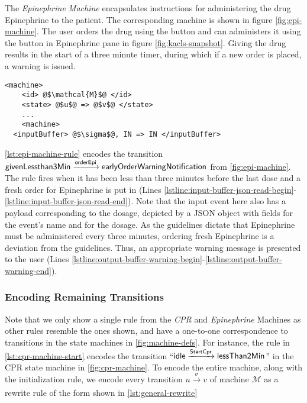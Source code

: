 The \textit{Epinephrine Machine} encapsulates instructions for administering
the drug Epinephrine to the patient. The corresponding machine is shown in figure
\ref{fig:epi-machine}. The user orders the drug using the
 button and can administers it using the  button in
Epinephrine pane in figure \ref{fig:kacls-snapshot}. Giving the drug results in the
start of a three minute timer, during which if a new order is placed, a warning
is issued.

\begin{lstlisting}[float=b!,
  frame=single,
  style=ksty,
  language=k,
  label={lst:general-rewrite},
  caption={Transitions as $\K$-Rules}
]
  <machine>
    <id> @$\mathcal{M}$@ </id>
    <state> @$u$@ => @$v$@ </state>
    ...
    <machine>
  <inputBuffer> @$\sigma$@, IN => IN </inputBuffer>
\end{lstlisting}

\autoref{lst:epi-machine-rule} encodes the transition
$\text{\sffamily givenLessthan3Min} \xrightarrow[]{\text{\sffamily orderEpi}}
\text{\sffamily earlyOrderWarningNotification}$ from \autoref{fig:epi-machine}.
The rule fires when it has been less than three minutes
before the last dose and a fresh order for
Epinephrine is put in (Lines
\ref{lstline:input-buffer-json-read-begin}-\ref{lstline:input-buffer-json-read-end}).
Note that the input event here also has a payload corresponding to the dosage,
depicted by a JSON object with fields  for the event's name
and  for the dosage.
As the guidelines dictate that Epinephrine must be administered
every three minutes, ordering fresh Epinephrine is a deviation from the
guidelines. Thus, an appropriate warning message is presented to the user (Lines
\ref{lstline:output-buffer-warning-begin}-\ref{lstline:output-buffer-warning-end}).

\subsubsection{Encoding Remaining Transitions}

Note that we only show a single rule from the \textit{CPR} and
\textit{Epinephrine} Machines as other rules resemble the ones
shown, and have a one-to-one correspondence to transitions in the
state machines in \autoref{fig:machine-defs}. For instance,
the rule in \autoref{lst:cpr-machine-start} encodes the transition
``$\text{\sffamily idle} \xrightarrow[]{\text{\sffamily StartCpr}} \text{\sffamily lessThan2Min}$'' in the
CPR state machine in \autoref{fig:cpr-machine}. To encode the entire machine,
along with the initialization rule,
we encode every transition $u \xrightarrow[]{\sigma} v$
of machine $\mathcal{M}$ as a rewrite rule of the form shown in
\autoref{lst:general-rewrite}

